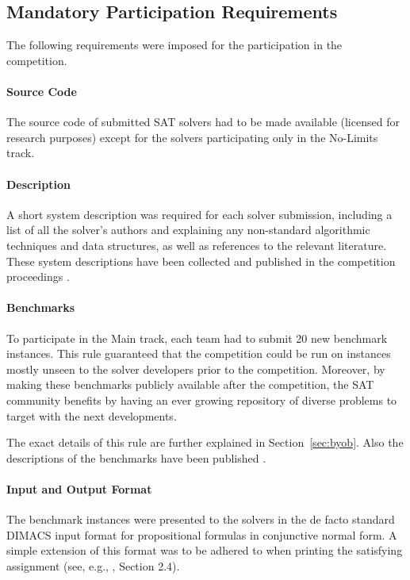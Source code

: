 \documentclass{elsarticle}
\begin{document}
\subsection{Mandatory Participation Requirements}
\label{sec:rules}

The following requirements were imposed for 
the participation in the competition.

\paragraph{Source Code}
The source code of submitted SAT solvers had to be made available 
(licensed for research purposes) except for the solvers participating only in the No-Limits track.

\paragraph{Description}
A short system description was required for each solver submission,
including a list of all the solver's authors and explaining any non-standard algorithmic
techniques and data structures, as well as references to the relevant literature.
These system descriptions have been collected and published in the competition
proceedings \cite{SC2020}.

\paragraph{Benchmarks}
To participate in the Main track, each team had to submit 20 new benchmark instances.
This rule guaranteed that the competition could be run on instances mostly unseen to the solver
developers prior to the competition. Moreover, by making these benchmarks publicly available
after the competition, the SAT community benefits by having an ever growing repository 
of diverse problems to target with the next developments.

The exact details of this rule are further explained in Section~\ref{sec:byob}.
Also the descriptions of the benchmarks have been published \cite{SC2020}.

\paragraph{Input and Output Format}

The benchmark instances were presented to the solvers in the de facto standard
DIMACS input format for propositional formulas in conjunctive normal form.
A simple extension of this format was to be adhered to when printing 
the satisfying assignment 
(see, e.g., \cite{DBLP:journals/jsat/HeuleJS19}, Section 2.4).
\end{document}
